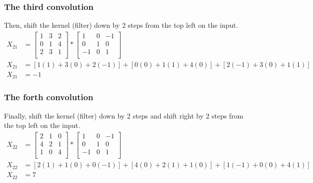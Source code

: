 \documentclass[12pt, a4paper]{article}
\begin{document}
                \subsubsection{The third convolution}
                    Then, shift the kernel (filter) down by 2 steps from the top left on the input.
                    \begin{align*}
                        {X}_{21} &=
                        \begin{bmatrix}
                            1 & 3 & 2 \\
                            0 & 1 & 4 \\
                            2 & 3 & 1 \\
                        \end{bmatrix}
                        \ast
                        \begin{bmatrix}
                            1  & 0 & -1 \\
                            0  & 1 & 0  \\
                            -1 & 0 & 1  \\
                        \end{bmatrix}
                        \\[1em]
                        {X}_{21} &= [1(1) + 3(0) + 2(-1)] + [0(0) + 1(1) + 4(0)] + [2(-1) + 3(0) + 1(1)] \\
                        {X}_{21} &= -1
                    \end{align*}

                \subsubsection{The forth convolution}
                    Finally, shift the kernel (filter) down by 2 steps and shift right by 2 steps from the top left on the input.
                    \begin{align*}
                        {X}_{22} &=
                        \begin{bmatrix}
                            2 & 1 & 0 \\
                            4 & 2 & 1 \\
                            1 & 0 & 4 \\
                        \end{bmatrix}
                        \ast
                        \begin{bmatrix}
                            1  & 0 & -1 \\
                            0  & 1 & 0  \\
                            -1 & 0 & 1  \\
                        \end{bmatrix}
                        \\[1em]
                        {X}_{22} &= [2(1) + 1(0) + 0(-1)] + [4(0) + 2(1) + 1(0)] + [1(-1) + 0(0) + 4(1)] \\
                        {X}_{22} &= 7
                    \end{align*}
\end{document}
